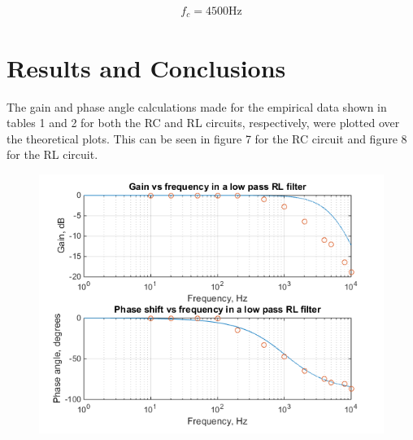 \documentclass{article}
\begin{document}
\begin{align*}
f_c = 4500 \si{\hertz}
\end{align*}

\newpage



\section{Results and Conclusions}

The gain and phase angle calculations made for the empirical data shown in tables 1 and 2 for both the RC and RL circuits, respectively, were plotted over the theoretical plots. This can be seen in figure 7 for the RC circuit and figure 8 for the RL circuit.

\begin{center}
	\begin{figure}[H]
		\begin{minipage}{0.6\textwidth}
			\includegraphics[scale=0.8]{bode3}
		\end{minipage}
	\end{figure}
\end{center}
\end{document}
